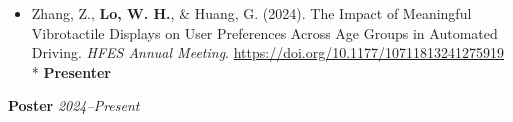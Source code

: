 \documentclass[11pt]{article}
\begin{document}
\begin{itemize}[leftmargin=*, topsep=0pt, itemsep=6pt]
  \item \begin{samepage}Zhang, Z., \textbf{Lo, W. H.}, \& Huang, G. (2024). The Impact of Meaningful Vibrotactile Displays on User Preferences Across Age Groups in Automated Driving. \textit{HFES Annual Meeting}. \href{https://doi.org/10.1177/10711813241275919}{\url{https://doi.org/10.1177/10711813241275919}}\\* \textbf{Presenter}
  \par\end{samepage}

\end{itemize}

\vspace{0.6em}


\textbf{Poster} \hfill \textit{2024--Present}

\vspace{0.4em}
\end{document}
